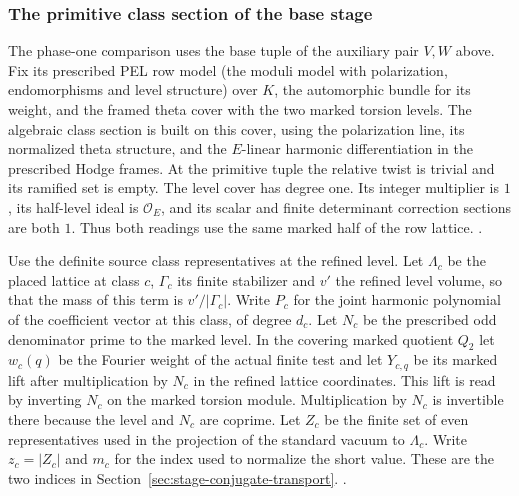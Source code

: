 \subsubsection{The primitive class section of the base stage}
\label{sec:stage-primitive-class}
The phase-one comparison uses the base tuple of the
auxiliary pair \(V,W\) above. Fix its prescribed PEL row
model (the moduli model with polarization, endomorphisms and
level structure) over \(K\), the automorphic bundle for its
weight, and the framed theta cover with the two marked
torsion levels. The algebraic class section is built on this
cover, using the polarization line, its normalized theta
structure, and the \(E\)-linear harmonic differentiation in
the prescribed Hodge frames. At the primitive tuple the
relative twist is trivial and its ramified set is empty.
The level cover has degree one. Its integer multiplier
is \(1\), its half-level ideal is \(\mathcal O_E\), and its
scalar and finite determinant correction sections are
both \(1\). Thus both readings use the same marked half
of the row lattice.
.

Use the definite source class representatives at the
refined level. Let \(\Lambda_c\) be the placed lattice at
class \(c\), \(\Gamma_c\) its finite stabilizer and \(v'\)
the refined level volume, so that the mass of this term is
\(v'/|\Gamma_c|\). Write \(P_c\) for the joint harmonic
polynomial of the coefficient vector at this class, of
degree \(d_c\). Let \(N_c\) be the prescribed odd
denominator prime to the marked level. In the covering
marked quotient \(Q_2\) let \(w_c(q)\) be the Fourier
weight of the actual finite test and let \(Y_{c,q}\)
be its marked lift after multiplication by \(N_c\)
in the refined lattice coordinates. This lift is
read by inverting \(N_c\) on the marked torsion module.
Multiplication by \(N_c\) is invertible there because
the level and \(N_c\) are coprime. Let \(Z_c\) be the
finite set of even representatives used in the projection
of the standard vacuum to \(\Lambda_c\). Write
\(z_c=|Z_c|\) and \(m_c\) for the index used to normalize
the short value. These are the two indices in
Section~\ref{sec:stage-conjugate-transport}.
.

